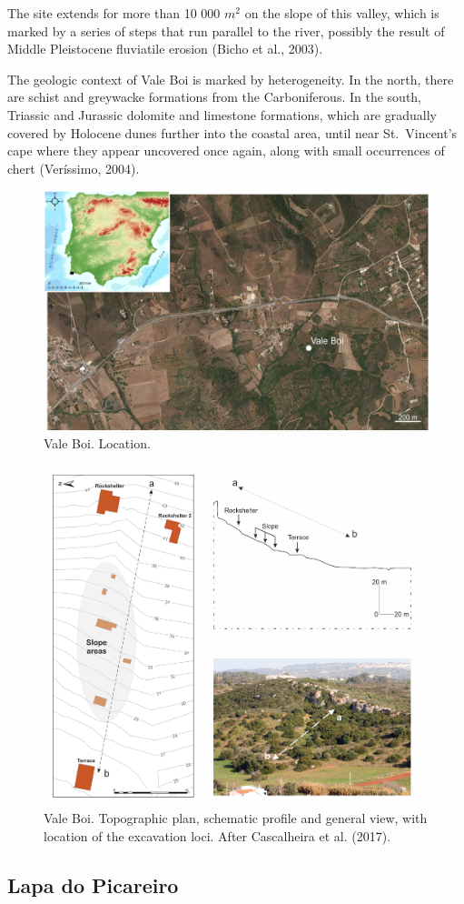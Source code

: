\documentclass[12pt,twoside]{reedthesis}
\begin{document}
The site extends for more than 10 000 \(m^2\) on the slope of this valley, which is marked by a series of steps that run parallel to the river, possibly the result of Middle Pleistocene fluviatile erosion (Bicho et al., 2003).

The geologic context of Vale Boi is marked by heterogeneity. In the north, there are schist and greywacke formations from the Carboniferous. In the south, Triassic and Jurassic dolomite and limestone formations, which are gradually covered by Holocene dunes further into the coastal area, until near St.~Vincent's cape where they appear uncovered once again, along with small occurrences of chert (Veríssimo, 2004).
\begin{figure}

{\centering \includegraphics[width=0.6\linewidth]{figure/vale_boi_map} 

}

\caption{Vale Boi. Location.}\label{fig:vbmap}
\end{figure}
\begin{figure}

{\centering \includegraphics[width=0.6\linewidth]{figure/vb_plan} 

}

\caption{Vale Boi. Topographic plan, schematic profile and general view, with location of the excavation loci. After Cascalheira et al. (2017).}\label{fig:vbphoto}
\end{figure}
\hypertarget{lapa-do-picareiro}{%
\subsection{Lapa do Picareiro}\label{lapa-do-picareiro}}
\end{document}
